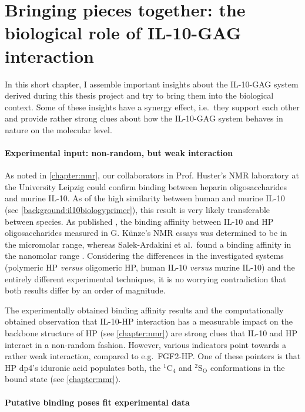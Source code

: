 \chapter{Bringing pieces together: the biological role of IL-10-GAG interaction}

In this short chapter, I assemble important insights about the IL-10-GAG system
derived during this thesis project and try to bring them into the biological
context. Some of these insights have a synergy effect, i.e.\ they support each
other and provide rather strong clues about how the IL-10-GAG system behaves in
nature on the molecular level.


\subsubsection{Experimental input: non-random, but weak interaction}

As noted in \cref{chapter:nmr}, our collaborators in Prof. Huster's NMR
laboratory at the University Leipzig could confirm binding between heparin
oligosaccharides and murine IL-10. As of the high similarity between human and
murine IL-10 (see \cref{background:il10biologyprimer}), this result is very
likely transferable between species. As published \cite{kuenze_gehrcke_2014},
the binding affinity between IL-10 and HP oligosaccharides measured in G.
Künze's NMR essays was determined to be in the micromolar range, whereas
Salek-Ardakini et al.\ found a binding affinity in the nanomolar range
\cite{salek_ardakani_2000}. Considering the differences in the investigated
systems (polymeric HP \textit{versus} oligomeric HP, human IL-10 \textit{versus}
murine IL-10) and the entirely different experimental techniques, it is no
worrying contradiction that both results differ by an order of magnitude.

The experimentally obtained binding affinity results and the computationally
obtained observation that IL-10-HP interaction has a measurable impact on the
backbone structure of HP (see \cref{chapter:nmr}) are strong clues that IL-10
and HP interact in a non-random fashion. However, various indicators point
towards a rather weak interaction, compared to e.g.\ FGF2-HP. One of these
pointers is that HP dp4's iduronic acid populates both, the ${}^1$C${}_4$ and
${}^2$S${}_\mathrm{O}$ conformations in the bound state (see
\cref{chapter:nmr}).


\subsubsection{Putative binding poses fit experimental data}

